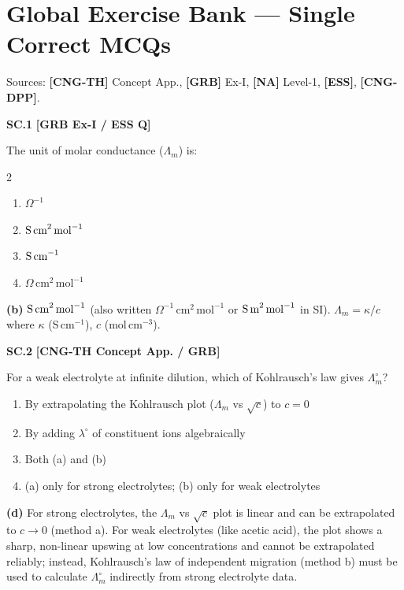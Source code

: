 \chapter*{Global Exercise Bank --- Single Correct MCQs}
\label{chap:single_correct}

\begin{tcolorbox}[enhanced,colback=subtlegreen,colframe=cengagegreen,arc=2mm,boxrule=1pt,
    title=\textbf{\large Single Correct Option MCQs (All Chapters)}]
Sources: \textbf{[CNG-TH]} Concept App., \textbf{[GRB]} Ex-I, \textbf{[NA]} Level-1, \textbf{[ESS]}, \textbf{[CNG-DPP]}.
\end{tcolorbox}

\begin{problembox}
\textbf{SC.1} \hfill \textbf{[GRB Ex-I / ESS Q]}

The unit of molar conductance ($\Lambda_m$) is:
\begin{multicols}{2}
\begin{enumerate}[label=(\alph*)]
    \item $\Omega^{-1}$
    \item $\text{S\,cm}^2\,\text{mol}^{-1}$
    \item $\text{S\,cm}^{-1}$
    \item $\Omega\,\text{cm}^2\,\text{mol}^{-1}$
\end{enumerate}
\end{multicols}
\end{problembox}
\begin{solution}
\textbf{(b)} $\text{S\,cm}^2\,\text{mol}^{-1}$ (also written $\Omega^{-1}\,\text{cm}^2\,\text{mol}^{-1}$ or $\text{S\,m}^2\,\text{mol}^{-1}$ in SI). $\Lambda_m = \kappa/c$ where $\kappa$ (S\,cm$^{-1}$), $c$ (mol\,cm$^{-3}$).
\end{solution}

\begin{problembox}
\textbf{SC.2} \hfill \textbf{[CNG-TH Concept App. / GRB]}

For a weak electrolyte at infinite dilution, which of Kohlrausch's law gives $\Lambda_m^\circ$?
\begin{enumerate}[label=(\alph*)]
    \item By extrapolating the Kohlrausch plot ($\Lambda_m$ vs $\sqrt{c}$) to $c=0$
    \item By adding $\lambda^\circ$ of constituent ions algebraically
    \item Both (a) and (b)
    \item (a) only for strong electrolytes; (b) only for weak electrolytes
\end{enumerate}
\end{problembox}
\begin{solution}
\textbf{(d)} For strong electrolytes, the $\Lambda_m$ vs $\sqrt{c}$ plot is linear and can be extrapolated to $c\to0$ (method a). For weak electrolytes (like acetic acid), the plot shows a sharp, non-linear upswing at low concentrations and cannot be extrapolated reliably; instead, Kohlrausch's law of independent migration (method b) must be used to calculate $\Lambda_m^\circ$ indirectly from strong electrolyte data.
\end{solution}


